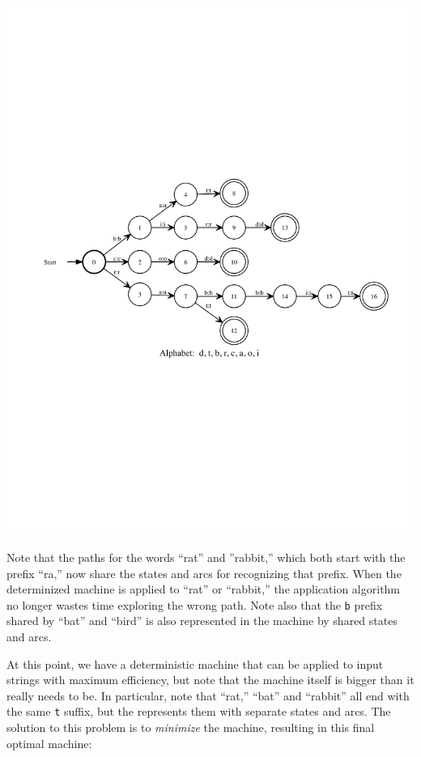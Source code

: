 \begin{center}
\includegraphics[width=135mm]{images/determinized.pdf}
\end{center}

\noindent
Note that the paths for the words ``rat'' and ''rabbit,'' which both start
with the prefix ``ra,'' now share the states and arcs for recognizing that
prefix.  When the determinized machine is applied to ``rat'' or ``rabbit,'' the
application algorithm no longer wastes time exploring the wrong path.  Note
also that the \texttt{b} prefix shared by ``bat'' and ``bird'' is also
represented in the machine by shared states and arcs.

At this point, we have a deterministic machine that can be applied to input
strings with maximum efficiency, but note that the machine itself is bigger
than it really needs to be.  In particular, note that ``rat,'' ``bat'' and
``rabbit'' all end with the same \texttt{t} suffix, but the \fsm{}
represents them with separate states and arcs.  The solution to this problem
is to \emph{minimize} the machine, resulting in this final optimal machine:


